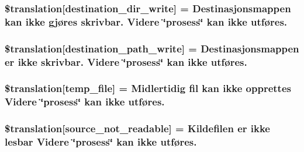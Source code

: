 \subsubsection[{\$translation}]{\setlength{\rightskip}{0pt plus 5cm}\$translation\mbox{[}\textquotesingle{}destination\+\_\+dir\+\_\+write\textquotesingle{}\mbox{]} = \textquotesingle{}Destinasjonsmappen kan ikke gjøres skrivbar. Videre \char`\"{}prosess\char`\"{} kan ikke utføres.\textquotesingle{}}\label{class_8upload_8no___n_o_8php_a97608ea194a616db49141a0e6dee900c}
\hypertarget{class_8upload_8no___n_o_8php_a40e4e1962226b89fd76da5819a9602b0}{}
\subsubsection[{\$translation}]{\setlength{\rightskip}{0pt plus 5cm}\$translation\mbox{[}\textquotesingle{}destination\+\_\+path\+\_\+write\textquotesingle{}\mbox{]} = \textquotesingle{}Destinasjonsmappen er ikke skrivbar. Videre \char`\"{}prosess\char`\"{} kan ikke utføres.\textquotesingle{}}\label{class_8upload_8no___n_o_8php_a40e4e1962226b89fd76da5819a9602b0}
\hypertarget{class_8upload_8no___n_o_8php_a2baece8da11e20d45175db91851ec3e3}{}
\subsubsection[{\$translation}]{\setlength{\rightskip}{0pt plus 5cm}\$translation\mbox{[}\textquotesingle{}temp\+\_\+file\textquotesingle{}\mbox{]} = \textquotesingle{}Midlertidig fil kan ikke opprettes Videre \char`\"{}prosess\char`\"{} kan ikke utføres.\textquotesingle{}}\label{class_8upload_8no___n_o_8php_a2baece8da11e20d45175db91851ec3e3}
\hypertarget{class_8upload_8no___n_o_8php_a922967ca2df0efdd455261142d8e5715}{}
\subsubsection[{\$translation}]{\setlength{\rightskip}{0pt plus 5cm}\$translation\mbox{[}\textquotesingle{}source\+\_\+not\+\_\+readable\textquotesingle{}\mbox{]} = \textquotesingle{}Kildefilen er ikke lesbar Videre \char`\"{}prosess\char`\"{} kan ikke utføres.\textquotesingle{}}\label{class_8upload_8no___n_o_8php_a922967ca2df0efdd455261142d8e5715}
\hypertarget{class_8upload_8no___n_o_8php_a346dfd1ade29f583dd20d345c436859f}{}
